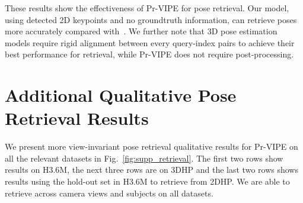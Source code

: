 These results show the effectiveness of Pr-VIPE for pose retrieval. Our model, using detected 2D keypoints and no groundtruth information, can retrieve poses more accurately compared with~\cite{kocabas2019self}. We further note that 3D pose estimation models require rigid alignment between every query-index pairs to achieve their best performance for retrieval, while Pr-VIPE does not require post-processing. 

\section{Additional Qualitative Pose Retrieval Results}\label{sec:pose_retrieval_qres}

We present more view-invariant pose retrieval qualitative results for Pr-VIPE on all the relevant datasets in Fig.~\ref{fig:supp_retrieval}. The first two rows show results on H3.6M, the next three rows are on 3DHP and the last two rows shows results using the hold-out set in H3.6M to retrieve from 2DHP. We are able to retrieve across camera views and subjects on all datasets.


